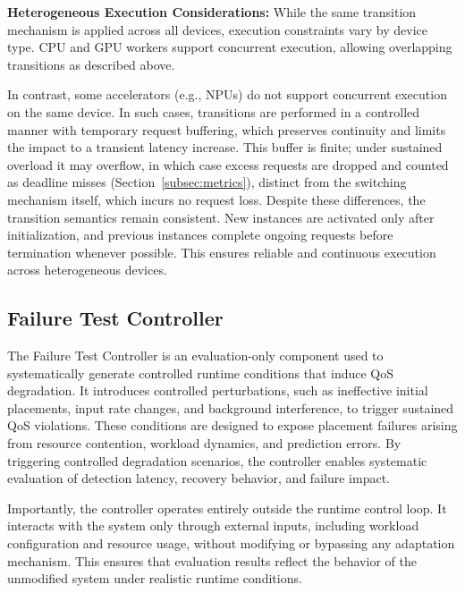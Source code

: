 \documentclass[conference]{IEEEtran}
\begin{document}
\noindent\textbf{Heterogeneous Execution Considerations: }
While the same transition mechanism is applied across all devices, execution constraints vary by device type. 
CPU and GPU workers support concurrent execution, allowing overlapping transitions as described above.

In contrast, some accelerators (e.g., NPUs) do not support concurrent execution on the same device. 
In such cases, transitions are performed in a controlled manner with temporary request buffering, which preserves continuity and limits the impact to a transient latency increase. \textcolor{navyblue}{This buffer is finite; under sustained overload it may overflow, in which case excess requests are dropped and counted as deadline misses (Section~\ref{subsec:metrics}), distinct from the switching mechanism itself, which incurs no request loss.}
%
Despite these differences, the transition semantics remain consistent. New instances are activated only after initialization, and previous instances complete ongoing requests before termination whenever possible. 
This ensures reliable and continuous execution across heterogeneous devices.



\subsection{Failure Test Controller}
\label{sec:failure_test_controller}
The Failure Test Controller is an evaluation-only component used to systematically generate controlled runtime conditions that induce QoS degradation. It introduces controlled perturbations, such as ineffective initial placements, input rate changes, and background interference, to trigger sustained QoS violations.
%
These conditions are designed to expose placement failures arising from resource contention, workload dynamics, and prediction errors. 
By triggering controlled degradation scenarios, the controller enables systematic evaluation of detection latency, recovery behavior, and failure impact.

Importantly, the controller operates entirely outside the runtime control loop. It interacts with the system only through external inputs, including workload configuration and resource usage, without modifying or bypassing any adaptation mechanism. 
This ensures that evaluation results reflect the behavior of the unmodified system under realistic runtime conditions.
\end{document}
